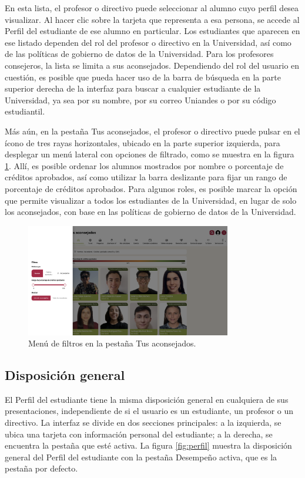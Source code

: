 En esta lista, el profesor o directivo puede seleccionar al alumno cuyo perfil desea visualizar. Al hacer clic sobre la tarjeta que representa a esa persona, se accede al Perfil del estudiante de ese alumno en particular. Los estudiantes que aparecen en ese listado dependen del rol del profesor o directivo en la Universidad, así como de las políticas de gobierno de datos de la Universidad. Para los profesores consejeros, la lista se limita a sus aconsejados. Dependiendo del rol del usuario en cuestión, es posible que pueda hacer uso de la barra de búsqueda en la parte superior derecha de la interfaz para buscar a cualquier estudiante de la Universidad, ya sea por su nombre, por su correo Uniandes o por su código estudiantil.

Más aún, en la pestaña Tus aconsejados, el profesor o directivo puede pulsar en el ícono de tres rayas horizontales, ubicado en la parte superior izquierda, para desplegar un menú lateral con opciones de filtrado, como se muestra en la figura \ref{fig:filtros}. Allí, es posible ordenar los alumnos mostrados por nombre o porcentaje de créditos aprobados, así como utilizar la barra deslizante para fijar un rango de porcentaje de créditos aprobados. Para algunos roles, es posible marcar la opción que permite visualizar a todos los estudiantes de la Universidad, en lugar de solo los aconsejados, con base en las políticas de gobierno de datos de la Universidad.

\begin{figure}[H]
	\centering
	\includegraphics[width=0.8\textwidth]{assets/nes/filtros.png}
	\caption{Menú de filtros en la pestaña Tus aconsejados.}
	\label{fig:filtros}
\end{figure}

\subsection{Disposición general}

El Perfil del estudiante tiene la misma disposición general en cualquiera de sus presentaciones, independiente de si el usuario es un estudiante, un profesor o un directivo. La interfaz se divide en dos secciones principales: a la izquierda, se ubica una tarjeta con información personal del estudiante; a la derecha, se encuentra la pestaña que esté activa. La figura \ref{fig:perfil} muestra la disposición general del Perfil del estudiante con la pestaña Desempeño activa, que es la pestaña por defecto.

